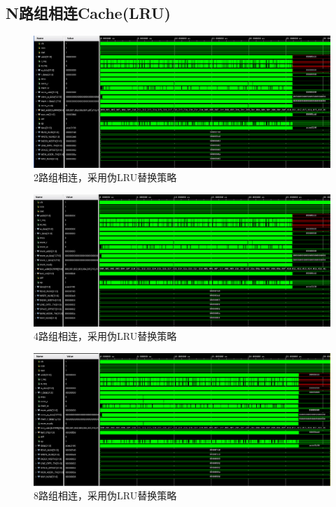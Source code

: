\documentclass[12pt,a4paper]{ctexart}
\begin{document}
\subsection{N路组相连Cache(LRU)}
\begin{figure}[H]
    \centering
    \includegraphics[scale=0.4]{pic/lru_2.png}
    \caption{2路组相连，采用伪LRU替换策略}
\end{figure}
\begin{figure}[H]
    \centering
    \includegraphics[scale=0.4]{pic/lru_4.png}
    \caption{4路组相连，采用伪LRU替换策略}
\end{figure}
\begin{figure}[H]
    \centering
    \includegraphics[scale=0.4]{pic/lru_8.png}
    \caption{8路组相连，采用伪LRU替换策略}
\end{figure}
\end{document}
